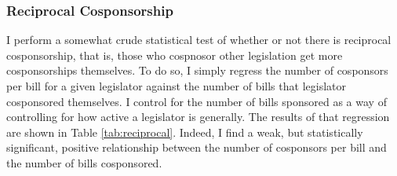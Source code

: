 \documentclass{article}
\begin{document}
  \subsubsection{Reciprocal Cosponsorship}
  I perform a somewhat crude statistical test of whether or not there is reciprocal cosponsorship, that is, those who cospnosor other legislation get more cosponsorships themselves. To do so, I simply regress the number of cosponsors per bill for a given legislator against the number of bills that legislator cosponsored themselves. I control for the number of bills sponsored as a way of controlling for how active a legislator is generally. The results of that regression are shown in Table \ref{tab:reciprocal}. Indeed, I find a weak, but statistically significant, positive relationship between the number of cosponsors per bill and the number of bills cosponsored.
\end{document}
